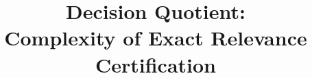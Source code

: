 \documentclass[11pt]{article}
\title{Decision Quotient:\\
Complexity of Exact Relevance Certification}
\begin{document}
\maketitle
\pentalogyfooter

\begin{abstract}

\end{abstract}















\end{document}
